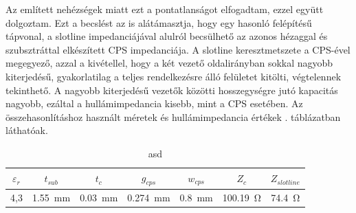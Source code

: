 \par Az említett nehézségek miatt ezt a pontatlanságot elfogadtam, ezzel együtt dolgoztam. Ezt a becslést az is alátámasztja, hogy egy hasonló felépítésű tápvonal, a slotline impedanciájával alulról becsülhető az azonos hézaggal és szubsztráttal elkészített CPS impedanciája. A slotline keresztmetszete a CPS-ével megegyező, azzal a kivétellel, hogy a két vezető oldalirányban sokkal nagyobb kiterjedésű, gyakorlatilag a teljes rendelkezésre álló felületet kitölti, végtelennek tekinthető. A nagyobb kiterjedésű vezetők közötti hosszegységre jutó kapacitás nagyobb, ezáltal a hullámimpedancia kisebb, mint a CPS esetében. Az összehasonlításhoz használt méretek és hullámimpedancia értékek . táblázatban láthatóak.
\begin{table}[h!]
	\centering
	\begin{tabular}{||c|c|c|c|c||c|c||}
	\hline
	$\varepsilon_r$ & $t_{sub}$ & $t_{c}$ & $g_{cps}$ & $w_{cps}$ & $Z_{c}$ & $Z_{slotline}$ \\ [0.5ex] 
	\hline\hline
	4,3 & \SI{1,55}{mm} & \SI{0,03}{mm} & \SI{0,274}{mm} & \SI{0,8}{mm} & \SI{100,19}{\ohm} & \SI{74,4}{\ohm}\\
	\hline
	\end{tabular}
	\caption{asd}
	\label{tab:slotline-cps}
\end{table}
